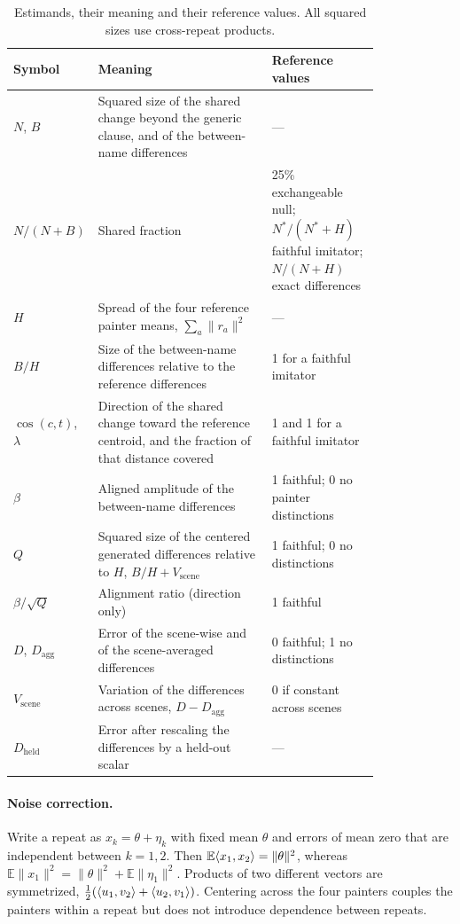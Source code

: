 \begin{table}[ht]
\caption{Estimands, their meaning and their reference values. All squared sizes use
cross-repeat products.}
\label{tab:estimands}
\vspace{2pt}
\centering\small
\begin{tabular}{@{}lp{0.52\linewidth}p{0.3\linewidth}@{}}
\toprule
Symbol & Meaning & Reference values\\
\midrule
$N$, $B$ & Squared size of the shared change beyond the generic clause, and of the
between-name differences & ---\\
$N/(N+B)$ & Shared fraction & 25\% exchangeable null; $N^*/(N^*+H)$ faithful imitator;
$N/(N+H)$ exact differences\\
$H$ & Spread of the four reference painter means, $\sum_a\|r_a\|^2$ & ---\\
$B/H$ & Size of the between-name differences relative to the reference differences & 1 for a
faithful imitator\\
$\cos(c,t)$, $\lambda$ & Direction of the shared change toward the reference centroid, and the
fraction of that distance covered & 1 and 1 for a faithful imitator\\
$\beta$ & Aligned amplitude of the between-name differences & 1 faithful; 0 no painter
distinctions\\
$Q$ & Squared size of the centered generated differences relative to $H$,
$B/H+V_{\mathrm{scene}}$ & 1 faithful; 0 no distinctions\\
$\beta/\sqrt{Q}$ & Alignment ratio (direction only) & 1 faithful\\
$D$, $D_{\mathrm{agg}}$ & Error of the scene-wise and of the scene-averaged differences & 0
faithful; 1 no distinctions\\
$V_{\mathrm{scene}}$ & Variation of the differences across scenes, $D-D_{\mathrm{agg}}$ & 0 if
constant across scenes\\
$D_{\mathrm{held}}$ & Error after rescaling the differences by a held-out scalar & ---\\
\bottomrule
\end{tabular}
\end{table}

\paragraph{Noise correction.} Write a repeat as $x_k=\theta+\eta_k$ with fixed mean $\theta$
and errors of mean zero that are independent between $k=1,2$. Then
$\mathbb E\langle x_1,x_2\rangle=\|\theta\|^2$, whereas $\mathbb E\|x_1\|^2=\|\theta\|^2+\mathbb
E\|\eta_1\|^2$. Products of two different vectors are symmetrized,
$\frac12(\langle u_1,v_2\rangle+\langle u_2,v_1\rangle)$. Centering across the four painters couples the painters
within a repeat but does not introduce dependence between repeats.

